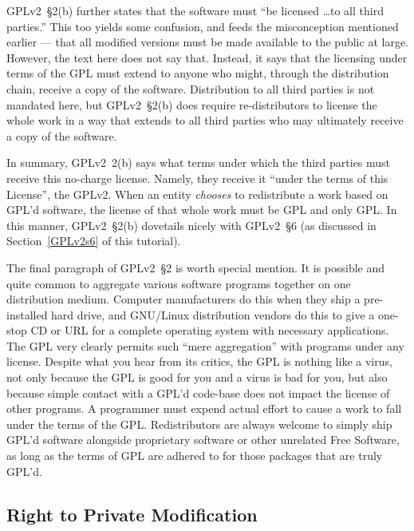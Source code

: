 GPLv2~\S2(b) further states that the software must ``be licensed \ldots to all
third parties.''  This too yields some confusion, and feeds the
misconception mentioned earlier --- that all modified versions must be made
available to the public at large.  However, the text here does not say
that.  Instead, it says that the licensing under terms of the GPL must
extend to anyone who might, through the distribution chain, receive a copy
of the software.  Distribution to all third parties is not mandated here,
but GPLv2~\S2(b) does require re-distributors to license the whole work in
a way that extends to all third parties who may ultimately receive a
copy of the software.

In summary, GPLv2\ 2(b) says what terms under which the third parties must
receive this no-charge license.  Namely, they receive it ``under the terms
of this License'', the GPLv2.  When an entity \emph{chooses} to redistribute
a work based on GPL'd software, the license of that whole 
work must be GPL and only GPL\@.  In this manner, GPLv2~\S2(b) dovetails nicely
with GPLv2~\S6 (as discussed in Section~\ref{GPLv2s6} of this tutorial).

\medskip

The final paragraph of GPLv2~\S2 is worth special mention.  It is possible and
quite common to aggregate various software programs together on one
distribution medium.  Computer manufacturers do this when they ship a
pre-installed hard drive, and GNU/Linux distribution vendors do this to
give a one-stop CD or URL for a complete operating system with necessary
applications.  The GPL very clearly permits such ``mere aggregation'' with
programs under any license.  Despite what you hear from its critics, the
GPL is nothing like a virus, not only because the GPL is good for you and
a virus is bad for you, but also because simple contact with a GPL'd
code-base does not impact the license of other programs.  A programmer must
expend actual effort  to cause a work to fall under the terms
of the GPL.  Redistributors are always welcome to simply ship GPL'd
software alongside proprietary software or other unrelated Free Software,
as long as the terms of GPL are adhered to for those packages that are
truly GPL'd.

\subsection{Right to Private Modification} 
\label{gplv2-private-modification}

